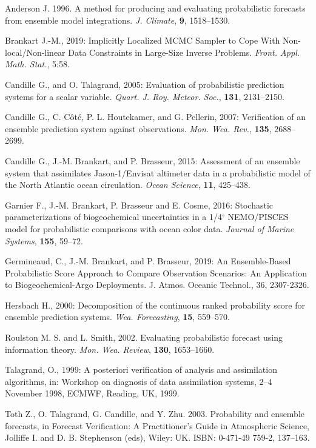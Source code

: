 \documentclass[11pt]{article}
\begin{document}
\begin{thebibliography}{}

Anderson J. 1996. A method for producing and evaluating probabilistic forecasts from ensemble model integrations. {\it J. Climate}, {\bf 9}, 1518--1530.

Brankart J.-M., 2019:
Implicitly Localized MCMC Sampler to Cope
With Non-local/Non-linear Data Constraints in Large-Size Inverse Problems.
\textit{Front. Appl. Math. Stat.}, 5:58.

Candille G., and O. Talagrand, 2005:
Evaluation of probabilistic prediction systems for a scalar variable.
{\it Quart. J. Roy. Meteor. Soc.}, {\bf 131}, 2131--2150.

Candille G., C. C\^ot\'e, P. L. Houtekamer, and G. Pellerin, 2007:
Verification of an ensemble prediction system against observations.
{\it Mon. Wea. Rev.}, {\bf 135}, 2688--2699.

Candille G., J.-M. Brankart, and P. Brasseur, 2015:
Assessment of an ensemble system that assimilates Jason-1/Envisat altimeter data
in a probabilistic model of the North Atlantic ocean circulation.
\textit{Ocean Science}, \textbf{11}, 425--438.

Garnier F., J.-M. Brankart, P. Brasseur and E. Cosme, 2016:
Stochastic parameterizations of biogeochemical uncertainties
in a 1/4$^\circ$ NEMO/PISCES model for probabilistic comparisons
with ocean color data.
\textit{Journal of Marine Systems}, \textbf{155}, 59--72.

Germineaud, C., J.-M. Brankart, and P. Brasseur, 2019: An Ensemble-Based Probabilistic Score Approach to Compare Observation Scenarios: An Application to Biogeochemical-Argo Deployments. J. Atmos. Oceanic Technol., 36, 2307-2326.

Hersbach H., 2000:
Decomposition of the continuous ranked probability score for ensemble prediction systems.
\textit{Wea. Forecasting}, \textbf{15}, 559--570.

Roulston M. S. and L. Smith, 2002. Evaluating probabilistic forecast using information theory. {\it Mon. Wea. Review}, {\bf 130}, 1653--1660.

Talagrand, O., 1999:
A posteriori verification of analysis and assimilation algorithms,
in: Workshop on diagnosis of data assimilation systems,
2--4 November 1998, ECMWF, Reading, UK, 1999.

Toth Z., O. Talagrand, G. Candille, and Y. Zhu. 2003. Probability and ensemble forecasts,  in Forecast Verification: A Practitioner's Guide in Atmospheric Science, Jolliffe I. and D. B. Stephenson (eds), Wiley: UK. ISBN: 0-471-49 759-2, 137--163.

\end{thebibliography}
\end{document}
